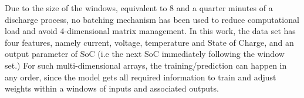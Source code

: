 Due to the size of the windows, equivalent to 8 and a quarter minutes of a discharge process, no batching mechanism has been used to reduce computational load and avoid 4-dimensional matrix management.
In this work, the data set has four features, namely current, voltage, temperature and State of Charge, and an output parameter of SoC (i.e the next SoC immediately following the window set.)
For such multi-dimensional arrays, the training/prediction can happen in any order, since the model gets all required information to train and adjust weights within a windows of inputs and associated outputs.

